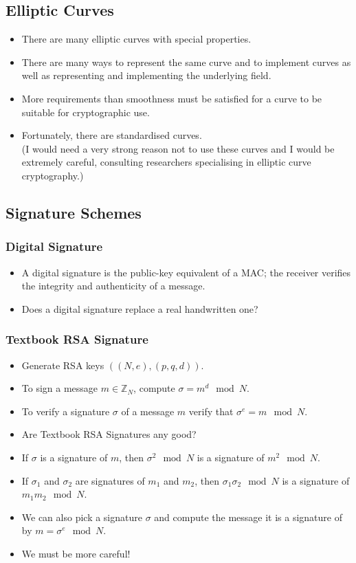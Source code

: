 \documentclass[a4paper]{scrartcl}
\begin{document}
\subsection*{Elliptic Curves}

\begin{itemize}
\item There are many elliptic curves with special properties. 
\item There are many ways to represent the same curve and to implement curves as well as representing and implementing the underlying field.
\item More requirements than smoothness must be satisfied for a curve to be suitable for cryptographic use.
\item Fortunately, there are standardised curves.\\(I would need a very strong reason not to use these curves and I would be extremely careful, consulting researchers specialising in elliptic curve cryptography.)
\end{itemize}

\subsection*{Signature Schemes}

\subsubsection*{Digital Signature}

\begin{itemize}
\item A digital signature is the public-key equivalent of a MAC; the receiver verifies the integrity and authenticity of a message.
\item Does a digital signature replace a real handwritten one?
\end{itemize}

\subsubsection*{Textbook RSA Signature}

\begin{itemize}
\item Generate RSA keys $((N,e), (p,q,d))$.
\item To sign a message $m \in \mathbb{Z}_N$, compute $\sigma = m^d \mod N$.
\item To verify a signature $\sigma$ of a message $m$ verify that $\sigma^e = m \mod N$.
\item Are Textbook RSA Signatures any good?
\item If $\sigma$ is a signature of $m$, then $\sigma^2 \mod N$ is a signature of $m^2 \mod N$.
\item If $\sigma_1$ and $\sigma_2$ are signatures of $m_1$ and $m_2$, then $\sigma_1\sigma_2 \mod N$ is a signature of $m_1m_2 \mod N$.
\item We can also pick a signature $\sigma$ and compute the message it is a signature of by $m = \sigma^e \mod N$.
\item We must be more careful!
\end{itemize}
\end{document}
